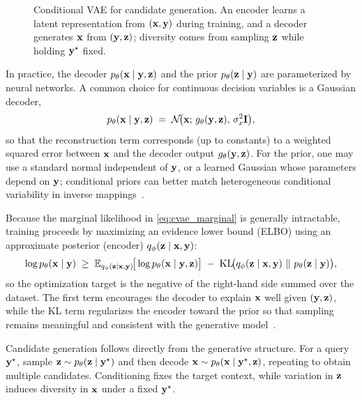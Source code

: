 \begin{figure}[t]
  \centering
  
  \caption[CVAE architecture]{Conditional VAE for candidate generation. An encoder learns a latent representation from $(\mathbf{x},\mathbf{y})$ during training, and a decoder generates $\mathbf{x}$ from $(\mathbf{y},\mathbf{z})$; diversity comes from sampling $\mathbf{z}$ while holding $\mathbf{y}^{\star}$ fixed.}
  \label{fig:cvae_architecture}
\end{figure}


In practice, the decoder $p_\theta(\mathbf{x}\mid\mathbf{y},\mathbf{z})$ and the prior $p_\theta(\mathbf{z}\mid\mathbf{y})$ are parameterized by neural networks. A common choice for continuous decision variables is a Gaussian decoder,
\[
  p_\theta(\mathbf{x}\mid\mathbf{y},\mathbf{z})
  \;=\;
  \mathcal{N}\!\big(\mathbf{x};\,g_\theta(\mathbf{y},\mathbf{z}),\,\sigma_x^2 \mathbf{I}\big),
\]
so that the reconstruction term corresponds (up to constants) to a weighted squared error between $\mathbf{x}$ and the decoder output $g_\theta(\mathbf{y},\mathbf{z})$. For the prior, one may use a standard normal independent of $\mathbf{y}$, or a learned Gaussian whose parameters depend on $\mathbf{y}$; conditional priors can better match heterogeneous conditional variability in inverse mappings~\cite{Sohn2015CVAE}.



Because the marginal likelihood in \eqref{eq:cvae_marginal} is generally intractable, training proceeds by maximizing an evidence lower bound (ELBO) using an approximate posterior (encoder) $q_\phi(\mathbf{z}\mid\mathbf{x},\mathbf{y})$:
\begin{equation}
  \log p_\theta(\vect{x}\mid\vect{y})
  \;\ge\;
  \mathbb{E}_{q_\phi(\vect{z}\mid\vect{x},\vect{y})}\!\big[\log p_\theta(\vect{x}\mid\vect{y},\vect{z})\big]
  \;-\;
  \mathrm{KL}\!\big(q_\phi(\vect{z}\mid\vect{x},\vect{y})\ \|\ p_\theta(\vect{z}\mid\vect{y})\big),
  \label{eq:cvae_elbo}
\end{equation}
so the optimization target is the negative of the right-hand side summed over the dataset. The first term encourages the decoder to explain $\mathbf{x}$ well given $(\mathbf{y},\mathbf{z})$, while the KL term regularizes the encoder toward the prior so that sampling remains meaningful and consistent with the generative model~\cite{Sohn2015CVAE}.



Candidate generation follows directly from the generative structure. For a query $\mathbf{y}^\star$, sample $\mathbf{z}\sim p_\theta(\mathbf{z}\mid\mathbf{y}^\star)$ and then decode $\mathbf{x}\sim p_\theta(\mathbf{x}\mid\mathbf{y}^\star,\mathbf{z})$, repeating to obtain multiple candidates. Conditioning fixes the target context, while variation in $\mathbf{z}$ induces diversity in $\mathbf{x}$ under a fixed $\mathbf{y}^\star$.


